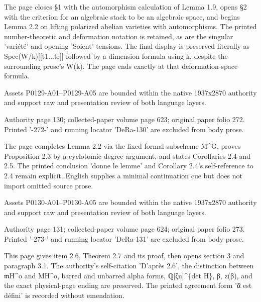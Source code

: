 \documentclass[11pt,a4paper]{article}
\begin{document}
The page closes §1 with the automorphism calculation of Lemma 1.9, opens §2 with the criterion for an algebraic stack to be an algebraic space, and begins Lemma 2.2 on lifting polarized abelian varieties with automorphisms. The printed number-theoretic and deformation notation is retained, as are the singular 'variété' and opening 'Soient' tensions. The final display is preserved literally as Spec(W/k)[[t\textunderscore{}1...t\textunderscore{}r]] followed by a dimension formula using k, despite the surrounding prose's W(k). The page ends exactly at that deformation-space formula.

Assets P0129-A01--P0129-A05 are bounded within the native 1937x2870 authority and support raw and presentation review of both language layers.


\par\medskip
\hypertarget{D018-P0130}{}
\par\smallskip
Authority page 130; collected-paper volume page 623; original paper folio 272. Printed '-272-' and running locator 'DeRa-130' are excluded from body prose.

The page completes Lemma 2.2 via the fixed formal subscheme M\textasciicircum{}G, proves Proposition 2.3 by a cyclotomic-degree argument, and states Corollaries 2.4 and 2.5. The printed conclusion 'donne le lemme' and Corollary 2.4's self-reference to 2.4 remain explicit. English supplies a minimal continuation cue but does not import omitted source prose.

Assets P0130-A01--P0130-A05 are bounded within the native 1937x2870 authority and support raw and presentation review of both language layers.


\par\medskip
\hypertarget{D018-P0131}{}
\par\smallskip
Authority page 131; collected-paper volume page 624; original paper folio 273. Printed '-273-' and running locator 'DeRa-131' are excluded from body prose.

This page gives item 2.6, Theorem 2.7 and its proof, then opens section 3 and paragraph 3.1. The authority's self-citation 'D'après 2.6', the distinction between \ensuremath{\mathfrak{m}}\textunderscore{}H\textasciicircum{}o and M\textunderscore{}H\textasciicircum{}o, barred and unbarred alpha forms, ℚ[ζ\textunderscore{}n]\textasciicircum{}\{det H\}, β, z(β), and the exact physical-page ending are preserved. The printed agreement form 'ᾱ est défini' is recorded without emendation.
\end{document}
